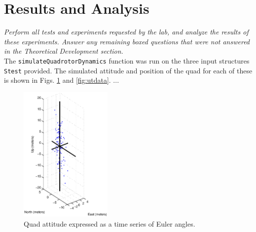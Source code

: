\documentclass[11pt]{article}
\begin{document}
\section{Results and Analysis}
\emph{Perform all tests and experiments requested by the lab, and analyze the
  results of these experiments. Answer any remaining boxed questions that were
  not answered in the Theoretical Development section.}\\

The {\tt simulateQuadrotorDynamics} function was run on the three input
structures {\tt Stest} provided.  The simulated attitude and position of the
quad for each of these is shown in Figs. \ref{fig:sca} and
\ref{fig:utdata}. ...

\begin{figure}[ht]
\begin{center}
\includegraphics[width=0.4\textwidth]{figs/sca2.eps}
\end{center}
\caption{Quad attitude expressed as a time series of Euler angles.}
\label{fig:sca}
\end{figure}
\end{document}
